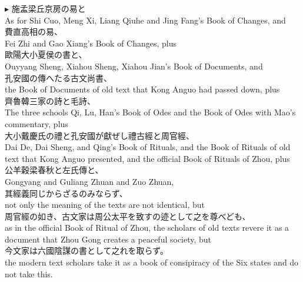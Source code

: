 \documentclass{ctexart}
\makeatletter
\newcommand*{\shifttext}[1]{%
  \settowidth{\@tempdima}{#1}%
  \hspace{-\@tempdima}#1%
}
\newcommand{\plabel}[1]{%
\shifttext{\textbf{#1}\quad}%
}
\makeatother
\begin{document}
\vspace{1em}
\plabel{$\blacktriangleright$}%
施\textperiodcentered 孟\textperiodcentered 梁丘\textperiodcentered 京房の易と\\
As for Shi Cuo, Meng Xi, Liang Qiuhe and Jing Fang's Book of Changes, and\\
費直\textperiodcentered 高相の易、\\
Fei Zhi and Gao Xiang's Book of Changes, plus\\
歐陽\textperiodcentered 大小夏侯の書と、\\
Ouyyang Sheng, Xiahou Sheng, Xiahou Jian's Book of Documents, and\\
孔安國の傳へたる古文尚書、\\
the Book of Documents of old text that Kong Anguo had passed down, plus\\
齊\textperiodcentered 魯\textperiodcentered 韓三家の詩と毛詩、\\
The three schools Qi, Lu, Han's Book of Odes and the Book of Odes with Mao's commentary, plus\\
大小戴\textperiodcentered 慶氏の禮と孔安國が獻ぜし禮古經と周官經、\\
Dai De, Dai Sheng, and Qing's Book of Rituals, and the Book of Rituals of old text that Kong Anguo presented, and the official Book of Rituals of Zhou, plus \\
公羊\textperiodcentered 穀梁春秋と左氏傳と、\\
Gongyang and Guliang Zhuan and Zuo Zhuan,\\
其經義同じからざるのみならず、\\
not only the meaning of the texts are not identical, but\\
周官經の如き、古文家は周公太平を致すの迹として之を尊べども、\\
as in the official Book of Ritual of Zhou, the scholars of old texts revere it as a document that Zhou Gong creates a peaceful society, but\\
今文家は六國陰謀の書として之れを取らず。\\
the modern text scholars take it as a book of consipiracy of the Six states and do not take this.
\end{document}
